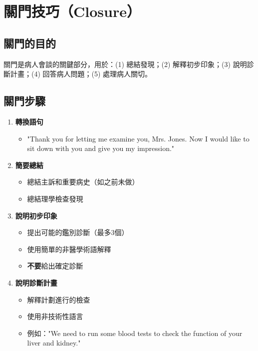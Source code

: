 \documentclass[12pt,a4paper]{article}
\newcommand{\note}[1]{
    \par
    \noindent
    \begin{tcolorbox}[
        colback=emergency_blue!5!white,
        colframe=emergency_blue,
        title=\textbf{重點提醒},
        fonttitle=\bfseries,
        boxrule=0.5pt,
        arc=3pt,
        left=6pt,
        right=6pt,
        top=6pt,
        bottom=6pt
    ]
    #1
    \end{tcolorbox}
}
\begin{document}
\section{關門技巧（Closure）}

\subsection{關門的目的}

\note{關門是病人會談的關鍵部分，用於：(1) 總結發現；(2) 解釋初步印象；(3) 說明診斷計畫；(4) 回答病人問題；(5) 處理病人關切。}

\subsection{關門步驟}

\begin{enumerate}
    \item \textbf{轉換語句}
    \begin{itemize}
        \item "Thank you for letting me examine you, Mrs. Jones. Now I would like to sit down with you and give you my impression."
    \end{itemize}
    
    \item \textbf{簡要總結}
    \begin{itemize}
        \item 總結主訴和重要病史（如之前未做）
        \item 總結理學檢查發現
    \end{itemize}
    
    \item \textbf{說明初步印象}
    \begin{itemize}
        \item 提出可能的鑑別診斷（最多3個）
        \item 使用簡單的非醫學術語解釋
        \item \textbf{不要}給出確定診斷
    \end{itemize}
    
    \item \textbf{說明診斷計畫}
    \begin{itemize}
        \item 解釋計劃進行的檢查
        \item 使用非技術性語言
        \item 例如："We need to run some blood tests to check the function of your liver and kidney."
    \end{itemize}
    

\end{enumerate}
\end{document}
